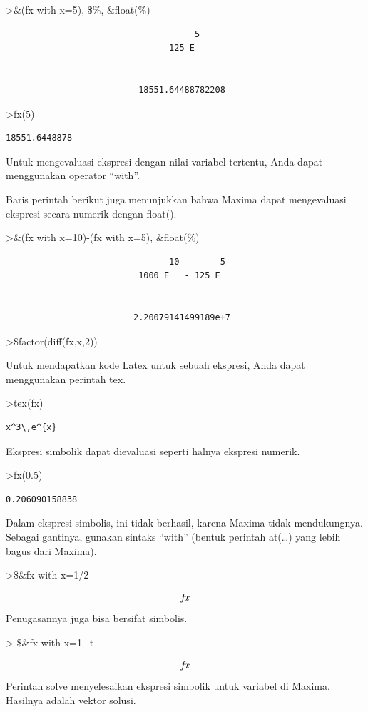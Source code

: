\documentclass[
]{book}
\begin{document}
\textgreater\&(fx with x=5), \$\%, \&float(\%)

\begin{verbatim}
                                     5
                                125 E


                          18551.64488782208
\end{verbatim}

\textgreater fx(5)

\begin{verbatim}
18551.6448878
\end{verbatim}

Untuk mengevaluasi ekspresi dengan nilai variabel tertentu, Anda dapat menggunakan operator ``with''.

Baris perintah berikut juga menunjukkan bahwa Maxima dapat mengevaluasi ekspresi secara numerik dengan float().

\textgreater\&(fx with x=10)-(fx with x=5), \&float(\%)

\begin{verbatim}
                                10        5
                          1000 E   - 125 E


                         2.20079141499189e+7
\end{verbatim}

\textgreater\$factor(diff(fx,x,2))

Untuk mendapatkan kode Latex untuk sebuah ekspresi, Anda dapat menggunakan perintah tex.

\textgreater tex(fx)

\begin{verbatim}
x^3\,e^{x}
\end{verbatim}

Ekspresi simbolik dapat dievaluasi seperti halnya ekspresi numerik.

\textgreater fx(0.5)

\begin{verbatim}
0.206090158838
\end{verbatim}

Dalam ekspresi simbolis, ini tidak berhasil, karena Maxima tidak mendukungnya. Sebagai gantinya, gunakan sintaks ``with'' (bentuk perintah at(\ldots) yang lebih bagus dari Maxima).

\textgreater\$\&fx with x=1/2

\[{\it fx}\]Penugasannya juga bisa bersifat simbolis.

\textgreater{} \$\&fx with x=1+t

\[{\it fx}\]Perintah solve menyelesaikan ekspresi simbolik untuk variabel di Maxima. Hasilnya adalah vektor solusi.
\end{document}

